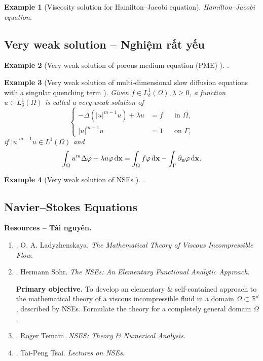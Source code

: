 \documentclass{article}
\newtheorem{example}{Example}
\begin{document}
\begin{example}[Viscosity solution for Hamilton--Jacobi equation]
	Hamilton--Jacobi equation.
\end{example}


\subsection{Very weak solution -- Nghiệm rất yếu}

\begin{example}[Very weak solution of porous medium equation (PME) \cite{Vazquez2007}]
	.
\end{example}

\begin{example}[Very weak solution of multi-dimensional slow diffusion equations with a singular quenching term \cite{Dao_Diaz_Nguyen2020}]
	Given $f\in L_\delta^1(\Omega),\lambda\ge0$, a function $u\in L_\delta^1(\Omega)$ is called a \emph{very weak solution} of
	\begin{equation*}
		\left\{\begin{split}
			-\Delta(|u|^{m-1}u) + \lambda u &= f&&\mbox{in }\Omega,\\
			|u|^{m-1}u &= 1&&\mbox{on }\Gamma,
		\end{split}\right.
	\end{equation*}
	if $|u|^{m-1}u\in L^1(\Omega)$ and
	\begin{equation*}
		\int_\Omega u^m\Delta\varphi + \lambda u\varphi\,{\rm d}{\bf x} = \int_\Omega f\varphi\,{\rm d}{\bf x} - \int_\Gamma \partial_{\bf n}\varphi\,{\rm d}{\bf x}.
	\end{equation*}
\end{example}

\begin{example}[Very weak solution of NSEs \cite{Tsai2018}]
	.
\end{example}

\subsection{Navier--Stokes Equations}
\textbf{\textsf{Resources -- Tài nguyên.}}
\begin{enumerate}
	\item \cite{Ladyzhenskaya1969}. {\sc O. A. Ladyzhenskaya}. {\it The Mathematical Theory of Viscous Incompressible Flow}.
	\item \cite{Sohr2001,Sohr2013}. {\sc Hermann Sohr}. {\it The NSEs: An Elementary Functional Analytic Approach}.
	
	{\bf Primary objective.} To develop an elementary \& self-contained approach to the mathematical theory of a viscous incompressible fluid in a domain $\Omega\subset\mathbb{R}^d$, described by NSEs. Formulate the theory for a completely general domain $\Omega$.
	\item \cite{Temam1977,Temam2000}. {\sc Roger Temam}. {\it NSES: Theory \& Numerical Analysis}.
	\item \cite{Tsai2018}. {\sc Tai-Peng Tsai}. {\it Lectures on NSEs}.
\end{enumerate}
\end{document}
